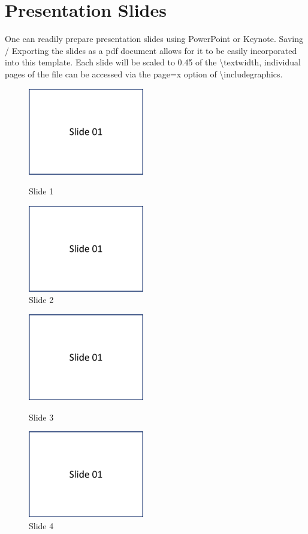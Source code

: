 \chapter{Presentation Slides}
One can readily prepare presentation slides using PowerPoint or Keynote. Saving / Exporting the slides as a pdf document allows for it to be easily incorporated into this template. Each slide will be scaled to 0.45 of the \textbackslash textwidth, individual pages of the file can be accessed via the page=x option of \textbackslash includegraphics.  


\begin{figure}[H]
\parbox{74.mm}{
    \centering
    \includegraphics[width=0.45\textwidth,page=1]{resources/PresentationSlides}
    \caption*{Slide 1}
}
    \parbox{74.mm}{
    \centering
    \includegraphics[width=0.45\textwidth,page=2]{resources/PresentationSlides}
    \caption*{Slide 2}
}
\end{figure}

\begin{figure}[H]
\parbox{74.mm}{
    \centering
    \includegraphics[width=0.45\textwidth,page=3]{resources/PresentationSlides}
    \caption*{Slide 3}
}
    \parbox{74.mm}{
    \centering
    \includegraphics[width=0.45\textwidth,page=4]{resources/PresentationSlides}
    \caption*{Slide 4}
}
\end{figure}

